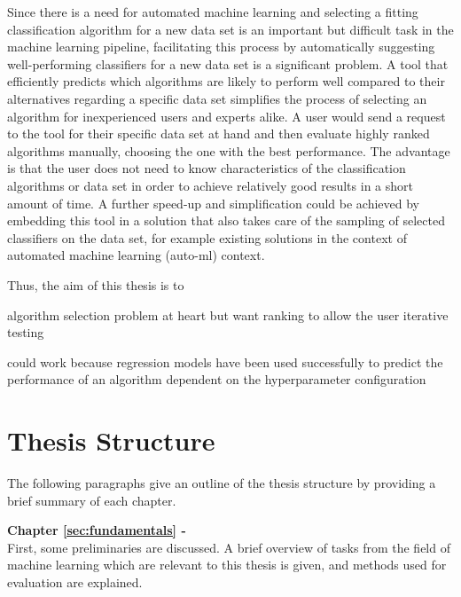 Since there is a need for automated machine learning and selecting a fitting classification algorithm for a new data set is an important but difficult task in the machine learning pipeline, facilitating this process by automatically suggesting well-performing classifiers for a new data set is a significant problem. A tool that efficiently predicts which algorithms are likely to perform well compared to their alternatives regarding a specific data set simplifies the process of selecting an algorithm for inexperienced users and experts alike. A user would send a request to the tool for their specific data set at hand and then evaluate highly ranked algorithms manually, choosing the one with the best performance. The advantage is that the user does not need to know characteristics of the classification algorithms or data set in order to achieve relatively good results in a short amount of time. A further speed-up and simplification could be achieved by embedding this tool in a solution that also takes care of the sampling of selected classifiers on the data set, for example existing solutions in the context of automated machine learning (auto-ml) context.

Thus, the aim of this thesis is to

algorithm selection problem at heart but want ranking to allow the user iterative testing

could work because regression models have been used successfully to predict the performance of an algorithm dependent on the hyperparameter configuration \cite{DBLP:conf/aaai/EggenspergerHHL15}

\section{Thesis Structure}
\label{sec:intro:structure}
The following paragraphs give an outline of the thesis structure by providing a brief summary of each chapter.

\textbf{Chapter \ref{sec:fundamentals} - } \\[0.2em]
First, some preliminaries are discussed. A brief overview of tasks from the field of machine learning which are relevant to this thesis is given, and methods used for evaluation are explained. 

